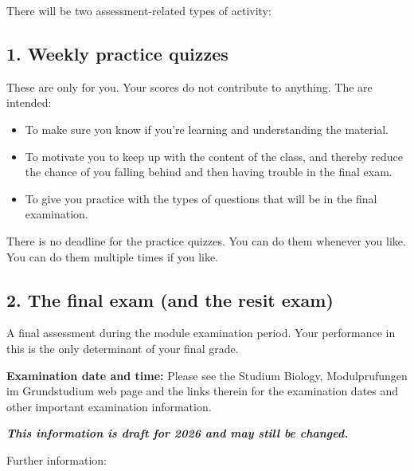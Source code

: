 \documentclass[
  letterpaper,
  8pt,
  a4paper]{book}
\providecommand{\tightlist}{%
  \setlength{\itemsep}{0pt}\setlength{\parskip}{0pt}}
\begin{document}

There will be two assessment-related types of activity:

\subsection*{1. Weekly practice quizzes}\label{weekly-practice-quizzes}

These are only for you. Your scores do not contribute to anything. The
are intended:

\begin{itemize}
\tightlist
\item
  To make sure you know if you're learning and understanding the
  material.
\item
  To motivate you to keep up with the content of the class, and thereby
  reduce the chance of you falling behind and then having trouble in the
  final exam.
\item
  To give you practice with the types of questions that will be in the
  final examination.
\end{itemize}

There is no deadline for the practice quizzes. You can do them whenever
you like. You can do them multiple times if you like.

\subsection*{2. The final exam (and the resit
exam)}\label{the-final-exam-and-the-resit-exam}

A final assessment during the module examination period. Your
performance in this is the only determinant of your final grade.

\textbf{Examination date and time:} Please see the Studium Biology,
Modulprufungen im Grundstudium web page and the links therein for the
examination dates and other important examination information.

\textbf{\emph{This information is draft for 2026 and may still be
changed.}}

Further information:
\end{document}
